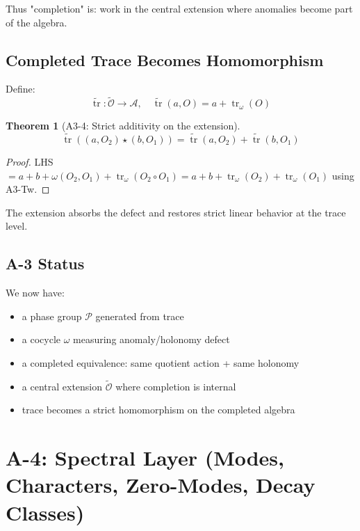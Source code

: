 \documentclass[12pt, oneside]{article}
\newtheorem{theorem}{Theorem}[section]
\DeclareMathOperator{\tr}{tr}
\newcommand{\A}{\mathcal{A}}
\newcommand{\Opr}{\mathcal{O}}
\newcommand{\wtilde}{\widetilde}
\begin{document}
Thus "completion" is: work in the central extension where anomalies become part of the algebra.

\subsection{Completed Trace Becomes Homomorphism}

Define:
\begin{equation}
\wtilde{\tr}: \wtilde{\Opr} \rightarrow \A,\quad \wtilde{\tr}(a, O) = a + \tr_\omega(O)
\end{equation}

\begin{theorem}[A3-4: Strict additivity on the extension]
\begin{equation}
\wtilde{\tr}((a, O_2) \star (b, O_1)) = \wtilde{\tr}(a, O_2) + \wtilde{\tr}(b, O_1)
\end{equation}
\end{theorem}

\begin{proof}
LHS $= a + b + \omega(O_2, O_1) + \tr_\omega(O_2 \circ O_1) = a + b + \tr_\omega(O_2) + \tr_\omega(O_1)$ using A3-Tw.
\end{proof}

The extension absorbs the defect and restores strict linear behavior at the trace level.

\subsection{A-3 Status}

We now have:
\begin{itemize}
    \item a phase group $\mathcal{P}$ generated from trace
    \item a cocycle $\omega$ measuring anomaly/holonomy defect
    \item a completed equivalence: same quotient action + same holonomy
    \item a central extension $\wtilde{\Opr}$ where completion is internal
    \item trace becomes a strict homomorphism on the completed algebra
\end{itemize}

\newpage

\section{A-4: Spectral Layer (Modes, Characters, Zero-Modes, Decay Classes)}
\end{document}

